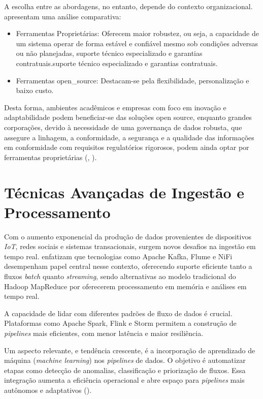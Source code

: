 A escolha entre as abordagens, no entanto, depende do contexto organizacional. \cite[]{boulahia2024} apresentam uma análise comparativa:
\begin{itemize}
\item Ferramentas Proprietárias: Oferecem maior robustez, ou seja, a capacidade de um sistema operar de forma estável e confiável mesmo sob condições adversas ou não planejadas, suporte técnico especializado e garantias contratuais.suporte técnico especializado e garantias contratuais.
\item Ferramentas \acs{open_source}: Destacam-se pela flexibilidade, personalização e baixo custo.
\end{itemize}
Desta forma, ambientes acadêmicos e empresas com foco em inovação e adaptabilidade podem beneficiar-se das soluções open source, enquanto grandes corporações, devido à necessidade de uma governança de dados robusta, que assegure a linhagem, a conformidade, a segurança e a qualidade das informações em conformidade com requisitos regulatórios rigorosos, podem ainda optar por ferramentas proprietárias (\cite[]{boulahia2024}, \cite[]{septian2019}).

\section{Técnicas Avançadas de Ingestão e Processamento}
\label{sec:avancos_tecnicas}

Com o aumento exponencial da produção de dados provenientes de dispositivos \textit{IoT}, redes sociais e sistemas transacionais, surgem novos desafios na ingestão em tempo real. \cite[]{murarka2024} enfatizam que tecnologias como Apache Kafka, Flume e NiFi desempenham papel central nesse contexto, oferecendo suporte eficiente tanto a fluxos \textit{batch} quanto \textit{streaming}, sendo alternativas ao modelo tradicional do Hadoop MapReduce por oferecerem processamento em memória e análises em tempo real.

A capacidade de lidar com diferentes padrões de fluxo de dados é crucial. Plataformas como Apache Spark, Flink  e Storm permitem a construção de \textit{pipelines} mais eficientes, com menor latência e maior resiliência.

Um aspecto relevante, e tendência crescente, é a incorporação de aprendizado de máquina (\textit{machine learning}) nos \textit{pipelines} de dados. O objetivo é automatizar etapas como detecção de anomalias, classificação e priorização de fluxos. Essa integração aumenta a eficiência operacional e abre espaço para \textit{pipelines} mais autônomos e adaptativos (\cite[]{murarka2024}).

